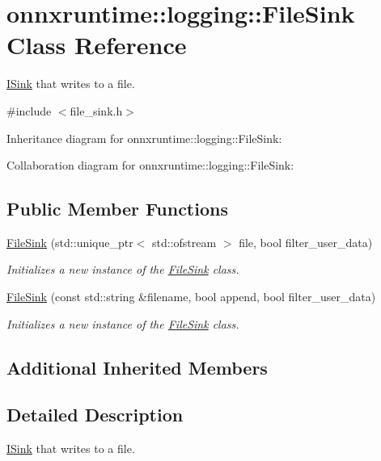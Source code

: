 \hypertarget{classonnxruntime_1_1logging_1_1FileSink}{}\section{onnxruntime\+:\+:logging\+:\+:File\+Sink Class Reference}
\label{classonnxruntime_1_1logging_1_1FileSink}


\mbox{\hyperlink{classonnxruntime_1_1logging_1_1ISink}{I\+Sink}} that writes to a file.  




{\ttfamily \#include $<$file\+\_\+sink.\+h$>$}



Inheritance diagram for onnxruntime\+:\+:logging\+:\+:File\+Sink\+:


Collaboration diagram for onnxruntime\+:\+:logging\+:\+:File\+Sink\+:
\subsection*{Public Member Functions}
\begin{DoxyCompactItemize}
\item 
\mbox{\hyperlink{classonnxruntime_1_1logging_1_1FileSink_ae0a80ac42257771d6c01abeb8b38f8d7}{File\+Sink}} (std\+::unique\+\_\+ptr$<$ std\+::ofstream $>$ file, bool filter\+\_\+user\+\_\+data)
\begin{DoxyCompactList}\small\item\em Initializes a new instance of the \mbox{\hyperlink{classonnxruntime_1_1logging_1_1FileSink}{File\+Sink}} class. \end{DoxyCompactList}\item 
\mbox{\hyperlink{classonnxruntime_1_1logging_1_1FileSink_a910d3af5b40f4efc87a612ce609fbc67}{File\+Sink}} (const std\+::string \&filename, bool append, bool filter\+\_\+user\+\_\+data)
\begin{DoxyCompactList}\small\item\em Initializes a new instance of the \mbox{\hyperlink{classonnxruntime_1_1logging_1_1FileSink}{File\+Sink}} class. \end{DoxyCompactList}\end{DoxyCompactItemize}
\subsection*{Additional Inherited Members}


\subsection{Detailed Description}
\mbox{\hyperlink{classonnxruntime_1_1logging_1_1ISink}{I\+Sink}} that writes to a file. 

